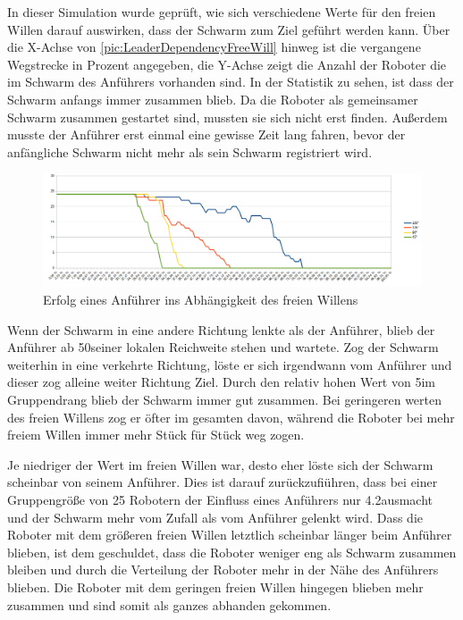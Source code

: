 In dieser Simulation wurde geprüft, wie sich verschiedene Werte für den freien Willen darauf auswirken, dass der Schwarm zum Ziel geführt werden kann. Über die X-Achse von \autoref{pic:LeaderDependencyFreeWill} hinweg ist die vergangene Wegstrecke in Prozent angegeben, die Y-Achse zeigt die Anzahl der Roboter die im Schwarm des Anführers vorhanden sind.
In der Statistik zu sehen, ist dass der Schwarm anfangs immer zusammen blieb. Da die Roboter als gemeinsamer Schwarm zusammen gestartet sind, mussten sie sich nicht erst finden. Außerdem musste der Anführer erst einmal eine gewisse Zeit lang fahren, bevor der anfängliche Schwarm nicht mehr als sein Schwarm registriert wird.

\begin{figure}[h]
	\includegraphics[width=\textwidth, height=\statisticHeight]{graphics/Statistics/Leader/DependencyFreeWill.png}
	\caption{Erfolg eines Anführer ins Abhängigkeit des freien Willens}
	\label{pic:LeaderDependencyFreeWill}
\end{figure}

Wenn der Schwarm in eine andere Richtung lenkte als der Anführer, blieb der Anführer ab 50\per seiner lokalen Reichweite stehen und wartete. Zog der Schwarm weiterhin in eine verkehrte Richtung, löste er sich irgendwann vom Anführer und dieser zog alleine weiter Richtung Ziel. Durch den relativ hohen Wert von 5\per im Gruppendrang blieb der Schwarm immer gut zusammen. Bei geringeren werten des freien Willens zog er öfter im gesamten davon, während die Roboter bei mehr freiem Willen immer mehr Stück für Stück weg zogen.

Je niedriger der Wert im freien Willen war, desto eher löste sich der Schwarm scheinbar von seinem Anführer. Dies ist darauf zurückzufiühren, dass bei einer Gruppengröße von 25 Robotern der Einfluss eines Anführers nur 4.2\per ausmacht und der Schwarm mehr vom Zufall als vom Anführer gelenkt wird. Dass die Roboter mit dem größeren freien Willen letztlich scheinbar länger beim Anführer blieben, ist dem geschuldet, dass die Roboter weniger eng als Schwarm zusammen bleiben und durch die Verteilung der Roboter mehr in der Nähe des Anführers blieben. Die Roboter mit dem geringen freien Willen hingegen blieben mehr zusammen und sind somit als ganzes abhanden gekommen.

